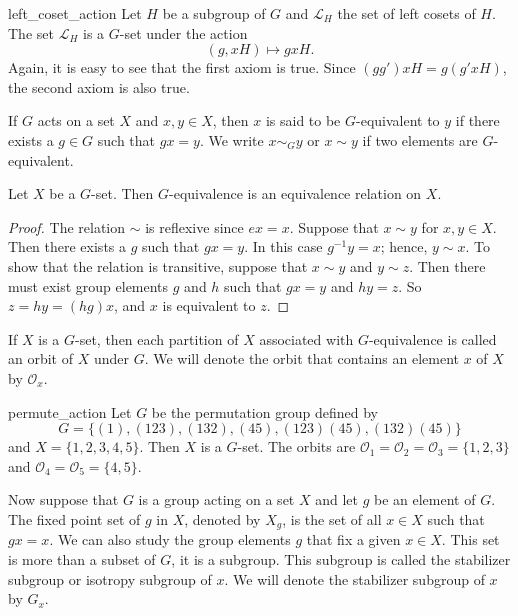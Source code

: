  
\begin{example}{left_coset_action}
Let $H$ be a subgroup of $G$ and ${\mathcal L}_H$ the set of left cosets
of $H$.  The set ${\mathcal L}_H$ is a $G$-set under the action
\[
(g, xH) \mapsto gxH.
\]
Again, it is easy to see that the first axiom is true. Since $(g g')xH
= g( g'x H)$, the second axiom is  also true.
\end{example}
 
 
 
If $G$ acts on a set $X$ and $x, y \in X$, then $x$ is said to be
{\bfi  $G$-equivalent\/} to $y$ if there exists a
$g \in G$ such that $gx =y$. We  write $x \sim_G y$ or $x \sim y$ if
two elements are $G$-equivalent. 
 
 
\begin{proposition}
Let  $X$ be a $G$-set. Then $G$-equivalence is an equivalence relation
on $X$. 
\end{proposition}
 
 
\begin{proof}
The relation $\sim$ is reflexive since $ex = x$. Suppose that $x \sim
y$ for $x, y \in X$. Then there exists a $g$ such that $gx = y$. In
this case $g^{-1}y=x$; hence, $y \sim x$. To show that the relation is
transitive, suppose that $x \sim y$ and $y \sim z$. Then there must
exist group elements $g$ and $h$ such that $gx = y$ and $hy= z$. So $z
= hy = (hg)x$, and  $x$ is equivalent to $z$.
\end{proof}
 
 
\medskip
 
 
If $X$ is a $G$-set, then each partition of $X$ associated with
$G$-equivalence is called an {\bfi orbit\/} of $X$ under
$G$.  We will denote the orbit that contains an element $x$  of $X$ by
${\mathcal O}_x$\label{noteorbit}. 
 
 
\begin{example}{permute_action}
Let $G$ be the permutation group defined by
\[
G =\{(1), (1 2
3), (1 3 2), (4 5), (1 2 3)(4 5), (1 3 2)(4 5) \}
\]
and $X = \{ 1, 2, 3, 4, 5\}$. Then $X$ is a $G$-set. The orbits are
${\mathcal O}_1 = {\mathcal O}_2 = {\mathcal O}_3 =\{1, 2, 3\}$ and $ {\mathcal O}_4=
{\mathcal O}_5 = \{4, 5\}$. 
\end{example}
 
 

 
 
Now suppose that $G$ is a group acting on a set $X$ and let $g$ be
an element of $G$. The {\bfi fixed point set\/} of $g$ in $X$, denoted by $X_g$\label{notefixed}, is the set of 
all $x \in X$ such
that $gx = x$.  We can also study the group elements $g$ that fix a
given $x \in X$. This set is more than a subset of  $G$, it is a
subgroup.  This subgroup is called the {\bfi stabilizer 
subgroup\/} or {\bfi isotropy 
subgroup\/} of $x$. We will denote the 
stabilizer subgroup of $x$ by $G_x$\label{noteisotropy}. 
 

